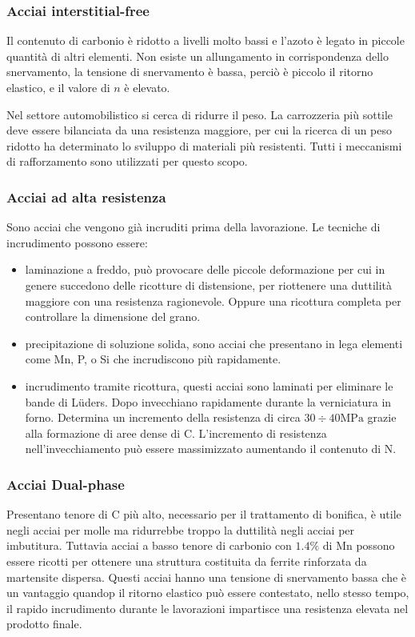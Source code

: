 \subsubsection{Acciai interstitial-free}
Il contenuto di carbonio è ridotto a livelli molto bassi e l'azoto è legato in piccole quantità di altri elementi. Non esiste un allungamento in corrispondenza dello snervamento, la tensione di snervamento è bassa, perciò è piccolo il ritorno elastico, e il valore di $n$ è elevato.

Nel settore automobilistico si cerca di ridurre il peso. La carrozzeria più sottile deve essere bilanciata da una resistenza maggiore, per cui la ricerca di un peso ridotto ha determinato lo sviluppo di materiali più resistenti. Tutti i meccanismi di rafforzamento sono utilizzati per questo scopo.

\subsubsection{Acciai ad alta resistenza}
Sono acciai che vengono già incruditi prima della lavorazione. 
Le tecniche di incrudimento possono essere:
\begin{itemize}
\item laminazione a freddo, può provocare delle piccole deformazione per cui in genere succedono delle ricotture di distensione, per riottenere una duttilità maggiore con una resistenza ragionevole. Oppure una ricottura completa per controllare la dimensione del grano.
\item precipitazione di soluzione solida, sono acciai che presentano in lega elementi come Mn, P, o Si  che incrudiscono più rapidamente.
\item incrudimento tramite ricottura, questi acciai sono laminati per eliminare le bande di Lüders. Dopo invecchiano rapidamente durante la verniciatura in forno. Determina un incremento della resistenza di circa $30 \div 40\unit{\MPa}$ grazie alla formazione di aree dense di C.
L'incremento di resistenza nell'invecchiamento può essere massimizzato aumentando il contenuto di N.
\end{itemize}

\subsubsection{Acciai Dual-phase}
Presentano tenore di C più alto, necessario per il trattamento di bonifica, è utile negli acciai per molle ma ridurrebbe troppo la duttilità negli acciai per imbutitura. Tuttavia acciai a basso tenore di carbonio con $1.4\%$ di Mn possono essere ricotti per ottenere una struttura costituita da ferrite rinforzata da martensite dispersa.
Questi acciai  hanno una tensione di snervamento bassa che è un vantaggio quandop il ritorno elastico può essere contestato, nello stesso tempo, il rapido incrudimento durante le lavorazioni impartisce una resistenza elevata nel prodotto finale.

